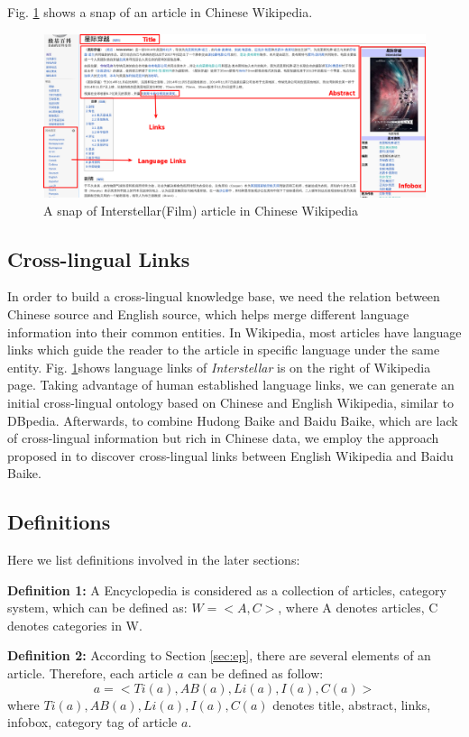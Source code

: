 \documentclass[runningheads,a4paper]{llncs}
\begin{document}
Fig. \ref{fig:interstellar} shows a snap of an article in Chinese Wikipedia.
\begin{figure}[ht]
    \centerline{\includegraphics[width=1\columnwidth]{fig/interstellar}}
    \label{fig:interstellar}
    \caption{A snap of Interstellar(Film) article in Chinese Wikipedia}
\end{figure}%

\subsection{Cross-lingual Links}
In order to build a cross-lingual knowledge base, we need the relation between Chinese source and English source, which helps merge different language information into their common entities. In Wikipedia, most articles have language links which guide the reader to the article in specific language under the same entity. Fig. \ref{fig:interstellar}shows language links of \emph{Interstellar} is on the right of Wikipedia page. Taking advantage of human established language links, we can generate an initial cross-lingual ontology based on Chinese and English Wikipedia, similar to DBpedia. Afterwards, to combine Hudong Baike and Baidu Baike, which are lack of cross-lingual information but rich in Chinese data, we employ the approach proposed in \cite{wang2012cross} to discover cross-lingual links between English Wikipedia and Baidu Baike.

\subsection{Definitions}
\label{sec:definition}
Here we list definitions involved in the later sections:

\textbf{Definition 1:} A Encyclopedia is considered as a collection of articles, category system, which can be defined as: $W = <A,C>$, where A denotes articles, C denotes categories in W.

\textbf{Definition 2:} According to Section \ref{sec:ep}, there are several elements of an article. Therefore, each article $a$ can be defined as follow:
\begin{equation}
    a = <Ti(a),AB(a),Li(a),I(a),C(a)>
\end{equation}
where $Ti(a),AB(a),Li(a),I(a),C(a)$ denotes title, abstract, links, infobox, category tag of article $a$.
\end{document}
